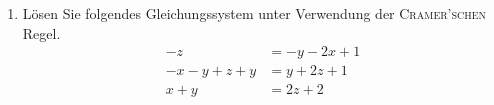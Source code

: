 \documentclass[12pt,a4paper]{scrreprt}
\begin{document}
\begin{enumerate}
\item 
Lösen Sie folgendes Gleichungssystem  unter Verwendung der \textsc{Cramer'schen} Regel.
	\begin{align*}
		-z			&= -y-2x+1 \\
		-x-y+z +y	&= y+2z+1 \\
		x+y			&= 2z+2
	\end{align*}
\begin{comment}
erst umforme in Standardform
A=\begin{pmatrix}2 1 -1 \\
-1 -1 -1 \\
1 1 -2
\end{pmatrix}, \vec{b} = \begin{pmatrix} 1 \\ 1 \\ 2 \end{pmatrix}, vec{x} = \begin{pmatrix} x \\ y \\ z \end{pmatrix}
det A = -1 \neq 0 \Rightarrow LGS eindeutlich lösbar \Rightarrow CRAMERsche Regel ist anwendbar
x = \frac{\begin{matrix}
1 1 -1 \\
1 -1 -1 \\
2 1 -2
\end{matrix}}{-1} = 0

y = \frac{\begin{matrix}
2  1  -1 \\
-1 1 -1 \\
1  2  -2
\end{matrix}}{-1} = 0

z = \frac{\begin{matrix}
2 1 1 \\
-1 -1 1 \\
1 1 2
\end{matrix}}{-1} = \frac{1}{-1} = -1

\end{comment}


%
%
%

\end{enumerate}
\end{document}

